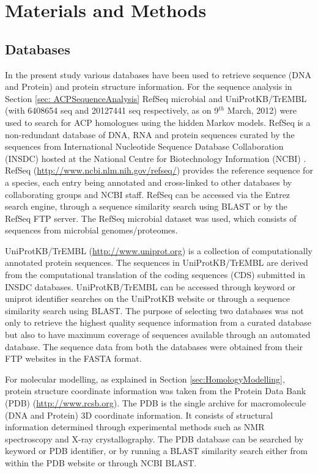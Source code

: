 	\chapter{Materials and Methods}
\label{cha:MaterialsAndMethods}

	\section{Databases}
	\label{sec:Databases}
	In the present study various databases have been used to retrieve sequence (DNA and Protein) and protein structure information. For the sequence analysis in Section \ref{sec: ACPSequenceAnalysis} RefSeq microbial and UniProtKB/TrEMBL (with 6408654 seq and 20127441 seq respectively, as on 9$^{th}$ March, 2012) were used to search for ACP homologues using the hidden Markov models. RefSeq is a non-redundant database of DNA, RNA and protein sequences curated by the sequences from International Nucleotide Sequence Database Collaboration (INSDC) hosted at the National Centre for Biotechnology Information (NCBI) . RefSeq (\url{http://www.ncbi.nlm.nih.gov/refseq/}) provides the reference sequence for a species, each entry being annotated and cross-linked to other databases by collaborating groups and NCBI staff. RefSeq can be accessed via the Entrez search engine, through a sequence similarity search using BLAST  or by the RefSeq FTP server. The RefSeq microbial dataset was used, which consists of sequences from microbial genomes/proteomes. 

	UniProtKB/TrEMBL (\url{http://www.uniprot.org}) is a collection of computationally annotated protein sequences. The sequences in UniProtKB/TrEMBL are derived from the computational translation of the coding sequences (CDS) submitted in INSDC databases. UniProtKB/TrEMBL can be accessed through keyword or uniprot identifier searches on the UniProtKB website or through a sequence similarity search using BLAST. The purpose of selecting two databases was not only to retrieve the highest quality sequence information from a curated database but also to have maximum coverage of sequences available through an automated database. The sequence data from both the databases were obtained from their FTP websites in the FASTA format.
	
	For molecular modelling, as explained in Section \ref{sec:HomologyModelling}, protein structure coordinate information was taken from the Protein Data Bank (PDB)  (\url{http://www.rcsb.org}). The PDB is the single archive for macromolecule (DNA and Protein) 3D coordinate information. It consists of structural information determined through experimental methods such as NMR spectroscopy and X-ray crystallography. The PDB database can be searched by keyword or PDB identifier, or by running a BLAST similarity search either from within the PDB website or through NCBI BLAST.
	
